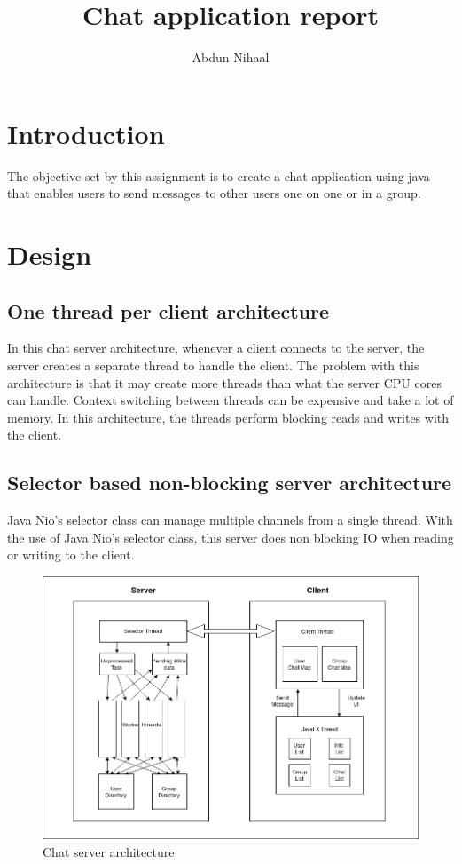 \documentclass{article}
\title{Chat application report}
\author{Abdun Nihaal}
\begin{document}
\maketitle

\section{Introduction}

The objective set by this assignment is to create a chat application using java that enables users to send messages to other users one on one or in a group.

\section{Design}

\subsection{One thread per client architecture}

In this chat server architecture, whenever a client connects to the server, the server creates a separate thread to handle the client.
The problem with this architecture is that it may create more threads than what the server CPU cores can handle.
Context switching between threads can be expensive and take a lot of memory.
In this architecture, the threads perform blocking reads and writes with the client.

\subsection{Selector based non-blocking server architecture}

Java Nio's selector class can manage multiple channels from a single thread. 
With the use of Java Nio's selector class, this server does non blocking IO when reading or writing to the client.

\begin{figure}
	\includegraphics[width=\linewidth]{architecture.png}
	\caption{Chat server architecture}
	\label{fig:architecture}
\end{figure}
\end{document}
